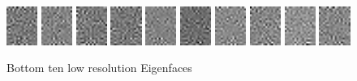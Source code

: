\begin{figure}[hbt]
  \includegraphics[width=0.09\textwidth]{../results/L_rez/eigenfaces/smallest1.jpg}
  \includegraphics[width=0.09\textwidth]{../results/L_rez/eigenfaces/smallest2.jpg}
  \includegraphics[width=0.09\textwidth]{../results/L_rez/eigenfaces/smallest3.jpg}
  \includegraphics[width=0.09\textwidth]{../results/L_rez/eigenfaces/smallest4.jpg}
  \includegraphics[width=0.09\textwidth]{../results/L_rez/eigenfaces/smallest5.jpg}
  \includegraphics[width=0.09\textwidth]{../results/L_rez/eigenfaces/smallest6.jpg}
  \includegraphics[width=0.09\textwidth]{../results/L_rez/eigenfaces/smallest7.jpg}
  \includegraphics[width=0.09\textwidth]{../results/L_rez/eigenfaces/smallest8.jpg}
  \includegraphics[width=0.09\textwidth]{../results/L_rez/eigenfaces/smallest9.jpg}
  \includegraphics[width=0.09\textwidth]{../results/L_rez/eigenfaces/smallest10.jpg}
  \caption{Bottom ten low resolution Eigenfaces}
  \label{fig:bot_efaces_l}
\end{figure}

